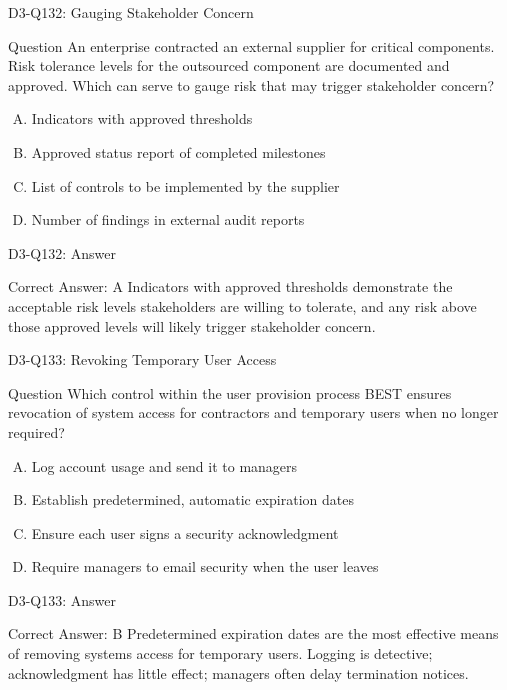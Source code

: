 \documentclass{beamer}
\begin{document}
	\begin{frame}{D3-Q132: Gauging Stakeholder Concern}
		\begin{block}{Question}
			An enterprise contracted an external supplier for critical components. Risk tolerance levels for the outsourced component are documented and approved. Which can serve to gauge risk that may trigger stakeholder concern?
		\end{block}
		\begin{enumerate}[(A)]
			\item Indicators with approved thresholds
			\item Approved status report of completed milestones
			\item List of controls to be implemented by the supplier
			\item Number of findings in external audit reports
		\end{enumerate}
	\end{frame}
	\begin{frame}{D3-Q132: Answer}
		\begin{block}{Correct Answer: A}
			Indicators with approved thresholds demonstrate the acceptable risk levels stakeholders are willing to tolerate, and any risk above those approved levels will likely trigger stakeholder concern.
		\end{block}
	\end{frame}
	
	\begin{frame}{D3-Q133: Revoking Temporary User Access}
		\begin{block}{Question}
			Which control within the user provision process BEST ensures revocation of system access for contractors and temporary users when no longer required?
		\end{block}
		\begin{enumerate}[(A)]
			\item Log account usage and send it to managers
			\item Establish predetermined, automatic expiration dates
			\item Ensure each user signs a security acknowledgment
			\item Require managers to email security when the user leaves
		\end{enumerate}
	\end{frame}
	\begin{frame}{D3-Q133: Answer}
		\begin{block}{Correct Answer: B}
			Predetermined expiration dates are the most effective means of removing systems access for temporary users. Logging is detective; acknowledgment has little effect; managers often delay termination notices.
		\end{block}
	\end{frame}
	
\end{document}
